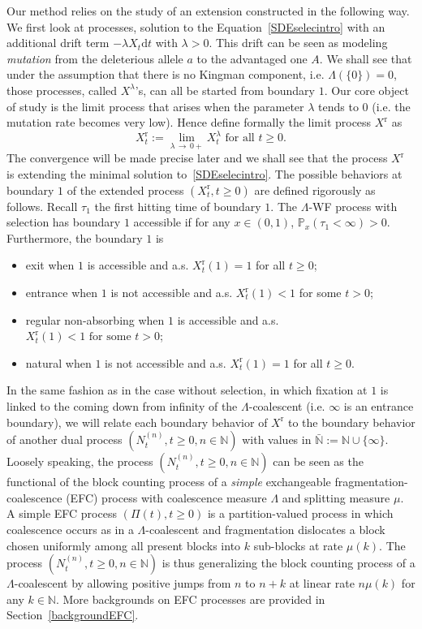 \documentclass[AHL,Unicode,longabstracts,published]{cedram}
\newcommand{\ddr}{\mathrm{d}}
\newcommand{\rmr}{\mathrm{r}}
\newcommand{\bbN}{\mathbb{N}}
\newcommand{\bbP}{\mathbb{P}}
\begin{document}
Our method relies on the study of an extension constructed in the following way. We first look at processes, solution to the Equation~\eqref{SDEselecintro} with an additional drift term $-\lambda X_t\ddr t$ with $\lambda>0$. This drift can be seen as modeling \emph{mutation} from the deleterious allele $a$ to the advantaged one $A$. We shall see that under the assumption that there is no Kingman component, i.e. $\Lambda(\{0\})=0$, those processes, called $X^{\lambda}$'s, can all be started from boundary $1$. Our core object of study is the limit process that arises when the parameter $\lambda$ tends to $0$ (i.e. the mutation rate becomes very low). Hence define formally the limit process $X^{\rmr}$ as
\[
X^{\rmr}_t:=\underset{\lambda\,\rightarrow\,0+}{\lim} X^{\lambda}_t \text{ for all } t\geq 0.
\]
The convergence will be made precise later and we shall see that the process $X^{\rmr}$ is extending the minimal solution to~\eqref{SDEselecintro}. The possible behaviors at boundary $1$ of the extended process $(X_t^{\rmr},t\geq 0)$ are defined rigorously as follows.
Recall $\tau_1$ the first hitting time of boundary $1$. The $\Lambda$-WF process with selection has boundary $1$ accessible if for any $x\in (0,1)$, $\bbP_x(\tau_1<\infty)>0$. Furthermore, the boundary $1$ is
\begin{itemize}
\item[-] exit when $1$ is accessible and a.s. $X^{\rmr}_t(1)=1$ for all $t\geq 0$;
\item[-] entrance when $1$ is not accessible and a.s. $X^{\rmr}_t(1)<1$ for some $t>0$;
\item[-] regular non-absorbing when $1$ is accessible and a.s. $X^{\rmr}_{t}(1)<1\text{ for some }t>0$;
\item[-] natural when $1$ is not accessible and a.s. $X_t^{\rmr}(1)=1$ for all $t\geq 0$.
\end{itemize}

In the same fashion as in the case without selection, in which fixation at $1$ is linked to the coming down from infinity of the $\Lambda$-coalescent (i.e. $\infty$ is an entrance boundary), we will relate each boundary behavior of $X^{\rmr}$ to the boundary behavior of another dual process $(N^{(n)}_t,t\geq 0,n\in \bbN)$ with values in $\bar{\bbN}:=\bbN\cup \{\infty\}$. Loosely speaking, the process $(N^{(n)}_t,t\geq 0,n\in \bbN)$ can be seen as the functional of the block counting process of a \emph{simple} exchangeable fragmentation-coalescence (EFC) process with coalescence measure $\Lambda$ and splitting measure $\mu$. A simple EFC process $(\Pi(t),t\geq 0)$ is a partition-valued process in which coalescence occurs as in a $\Lambda$-coalescent and fragmentation dislocates a block chosen uniformly among all present blocks into $k$ sub-blocks at rate $\mu(k)$. The process $(N^{(n)}_t,t\geq 0,n\in \bbN)$ is thus generalizing the block counting process of a $\Lambda$-coalescent by allowing positive jumps from $n$ to $n+k$ at linear rate $n\mu(k)$ for any $k\in \bbN$. More backgrounds on EFC processes are provided in Section~\ref{backgroundEFC}.
\end{document}
